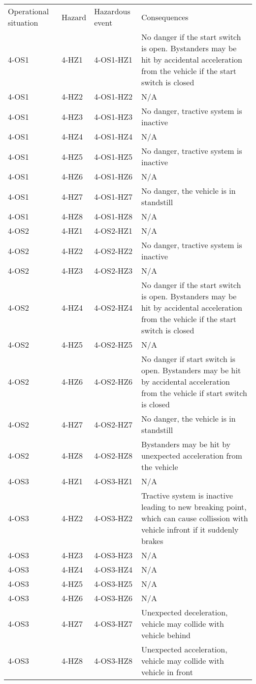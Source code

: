 \begin{center}
\begin{tabular}{l|l|l|l}
Operational situation	& Hazard		& Hazardous event	& Consequences \\
4-OS1		& 4-HZ1		& 4-OS1-HZ1		& No danger if the start switch is open. 
Bystanders may be hit by accidental acceleration from the vehicle if the start switch is closed \\
4-OS1		& 4-HZ2		& 4-OS1-HZ2		& N/A \\
4-OS1		& 4-HZ3		& 4-OS1-HZ3		& No danger, tractive system is inactive \\
4-OS1		& 4-HZ4		& 4-OS1-HZ4		& N/A \\	
4-OS1		& 4-HZ5		& 4-OS1-HZ5		& No danger, tractive system is inactive \\
4-OS1		& 4-HZ6		& 4-OS1-HZ6		& N/A \\
4-OS1		& 4-HZ7		& 4-OS1-HZ7		& No danger, the vehicle is in standstill \\
4-OS1		& 4-HZ8		& 4-OS1-HZ8		& N/A \\

4-OS2		& 4-HZ1		& 4-OS2-HZ1		& N/A \\	
4-OS2		& 4-HZ2		& 4-OS2-HZ2		& No danger, tractive system is inactive \\
4-OS2		& 4-HZ3		& 4-OS2-HZ3		& N/A \\
4-OS2		& 4-HZ4		& 4-OS2-HZ4		& No danger if the start switch is open.
Bystanders may be hit by accidental acceleration from the vehicle if the start switch is closed  \\
4-OS2		& 4-HZ5		& 4-OS2-HZ5		& N/A \\
4-OS2		& 4-HZ6		& 4-OS2-HZ6		& No danger if start switch is open.
Bystanders may be hit by accidental acceleration from the vehicle if start switch is closed  \\
4-OS2		& 4-HZ7		& 4-OS2-HZ7		& No danger, the vehicle is in standstill \\
4-OS2		& 4-HZ8		& 4-OS2-HZ8		& Bystanders may be hit by unexpected acceleration from the vehicle\\

4-OS3		& 4-HZ1		& 4-OS3-HZ1		& N/A \\
4-OS3		& 4-HZ2		& 4-OS3-HZ2		& Tractive system is inactive leading to new breaking point, 
which can cause collission with vehicle infront if it suddenly brakes \\
4-OS3		& 4-HZ3		& 4-OS3-HZ3		& N/A \\
4-OS3		& 4-HZ4		& 4-OS3-HZ4		& N/A \\
4-OS3		& 4-HZ5		& 4-OS3-HZ5		& N/A \\
4-OS3		& 4-HZ6		& 4-OS3-HZ6		& N/A \\
4-OS3		& 4-HZ7		& 4-OS3-HZ7		& Unexpected deceleration, vehicle may collide with vehicle behind\\
4-OS3		& 4-HZ8		& 4-OS3-HZ8		& Unexpected acceleration, vehicle may collide with vehicle in front\\
 

\end{tabular}
\end{center}
